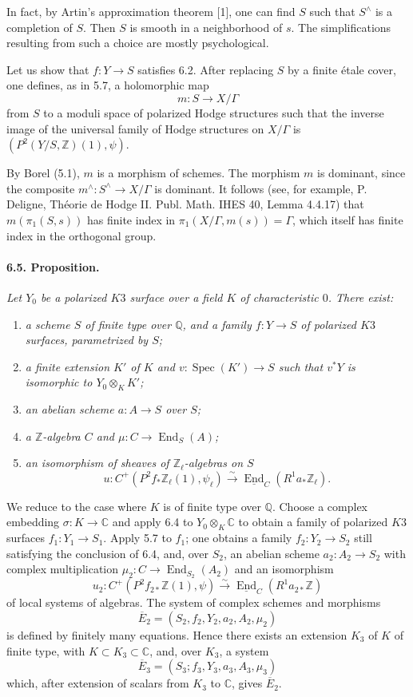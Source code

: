 \documentclass[10pt,leqno]{article}
\newcommand{\C}{\mathbb{C}}
\newcommand{\Q}{\mathbb{Q}}
\newcommand{\Z}{\mathbb{Z}}
\newcommand{\Spec}{\operatorname{Spec}}
\newcommand{\End}{\operatorname{End}}
\newcommand{\iso}{\xrightarrow{\sim}}
\begin{document}
\clearpage

In fact, by Artin's approximation theorem [1], one can find $S$ such that $S^\wedge$ is a completion of $S$. Then $S$ is smooth in a neighborhood of $s$. The simplifications resulting from such a choice are mostly psychological.

Let us show that $f:Y\to S$ satisfies 6.2. After replacing $S$ by a finite étale cover, one defines, as in 5.7, a holomorphic map
\[
m:S\longrightarrow X/\Gamma
\]
from $S$ to a moduli space of polarized Hodge structures such that the inverse image of the universal family of Hodge structures on $X/\Gamma$ is $(P^2(Y/S,\Z)(1),\psi)$.

By Borel (5.1), $m$ is a morphism of schemes. The morphism $m$ is dominant, since the composite $m^\wedge:S^\wedge\to X/\Gamma$ is dominant. It follows (see, for example, P. Deligne, Théorie de Hodge II. Publ. Math. IHES 40, Lemma 4.4.17) that $m(\pi_1(S,s))$ has finite index in $\pi_1(X/\Gamma,m(s))=\Gamma$, which itself has finite index in the orthogonal group.

\paragraph{6.5. Proposition.} \emph{Let $Y_0$ be a polarized $K3$ surface over a field $K$ of characteristic $0$. There exist:}
\begin{enumerate}[label=\alph*)]
\item \emph{a scheme $S$ of finite type over $\Q$, and a family $f:Y\to S$ of polarized $K3$ surfaces, parametrized by $S$;}
\item \emph{a finite extension $K'$ of $K$ and $v:\Spec(K')\to S$ such that $v^*Y$ is isomorphic to $Y_0\otimes_K K'$;}
\item \emph{an abelian scheme $a:A\to S$ over $S$;}
\item \emph{a $\Z$-algebra $C$ and $\mu:C\to\End_S(A)$;}
\item \emph{an isomorphism of sheaves of $\Z_\ell$-algebras on $S$}
\[
u:C^+(P^2f_*\Z_\ell(1),\psi_\ell)\iso \underline{\End}_C(R^1a_*\Z_\ell).
\]
\end{enumerate}

We reduce to the case where $K$ is of finite type over $\Q$. Choose a complex embedding $\sigma:K\to\C$ and apply 6.4 to $Y_0\otimes_K\C$ to obtain a family of polarized $K3$ surfaces $f_1:Y_1\to S_1$. Apply 5.7 to $f_1$; one obtains a family $f_2:Y_2\to S_2$ still satisfying the conclusion of 6.4, and, over $S_2$, an abelian scheme $a_2:A_2\to S_2$ with complex multiplication $\mu_2:C\to\End_{S_2}(A_2)$ and an isomorphism
\[
u_2:C^+(P^2f_{2*}\Z(1),\psi)\iso \underline{\End}_C(R^1a_{2*}\Z)
\]
of local systems of algebras. The system of complex schemes and morphisms
\[
\overline E_2=(S_2,f_2,Y_2,a_2,A_2,\mu_2)
\]
is defined by finitely many equations. Hence there exists an extension $K_3$ of $K$ of finite type, with $K\subset K_3\subset\C$, and, over $K_3$, a system
\[
\overline E_3=(S_3;f_3,Y_3,a_3,A_3,\mu_3)
\]
which, after extension of scalars from $K_3$ to $\C$, gives $\overline E_2$.
\end{document}
